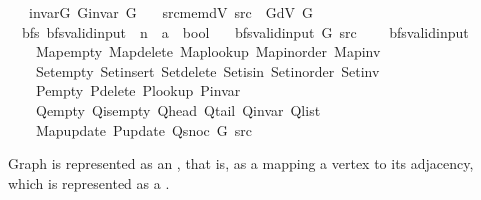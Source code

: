 \begin{isabellebody}
\ \ \ invar{\isacharunderscore}{\kern0pt}G{\isacharcolon}{\kern0pt}\ {\isachardoublequoteopen}G{\isachardot}{\kern0pt}invar\ G{\isachardoublequoteclose}\isanewline
\ \ \ src{\isacharunderscore}{\kern0pt}mem{\isacharunderscore}{\kern0pt}dV{\isacharcolon}{\kern0pt}\ {\isachardoublequoteopen}src\ {\isasymin}\ G{\isachardot}{\kern0pt}dV\ G{\isachardoublequoteclose}\isanewline
%
\isadeliminvisible
\isanewline
%
\endisadeliminvisible
%
\isataginvisible
{}\isamarkupfalse%
\ {\isacharparenleft}{\kern0pt}\ bfs{\isacharparenright}{\kern0pt}\ bfs{\isacharunderscore}{\kern0pt}valid{\isacharunderscore}{\kern0pt}input{\isacharprime}{\kern0pt}\ {\isacharcolon}{\kern0pt}{\isacharcolon}{\kern0pt}\ {\isachardoublequoteopen}{\isacharprime}{\kern0pt}n\ {\isasymRightarrow}\ {\isacharprime}{\kern0pt}a\ {\isasymRightarrow}\ bool{\isachardoublequoteclose}\ \isanewline
\ \ {\isachardoublequoteopen}bfs{\isacharunderscore}{\kern0pt}valid{\isacharunderscore}{\kern0pt}input{\isacharprime}{\kern0pt}\ G\ src\ {\isasymequiv}\isanewline
\ \ \ bfs{\isacharunderscore}{\kern0pt}valid{\isacharunderscore}{\kern0pt}input\isanewline
\ \ \ \ Map{\isacharunderscore}{\kern0pt}empty\ Map{\isacharunderscore}{\kern0pt}delete\ Map{\isacharunderscore}{\kern0pt}lookup\ Map{\isacharunderscore}{\kern0pt}inorder\ Map{\isacharunderscore}{\kern0pt}inv\isanewline
\ \ \ \ Set{\isacharunderscore}{\kern0pt}empty\ Set{\isacharunderscore}{\kern0pt}insert\ Set{\isacharunderscore}{\kern0pt}delete\ Set{\isacharunderscore}{\kern0pt}isin\ Set{\isacharunderscore}{\kern0pt}inorder\ Set{\isacharunderscore}{\kern0pt}inv\isanewline
\ \ \ \ P{\isacharunderscore}{\kern0pt}empty\ P{\isacharunderscore}{\kern0pt}delete\ P{\isacharunderscore}{\kern0pt}lookup\ P{\isacharunderscore}{\kern0pt}invar\isanewline
\ \ \ \ Q{\isacharunderscore}{\kern0pt}empty\ Q{\isacharunderscore}{\kern0pt}is{\isacharunderscore}{\kern0pt}empty\ Q{\isacharunderscore}{\kern0pt}head\ Q{\isacharunderscore}{\kern0pt}tail\ Q{\isacharunderscore}{\kern0pt}invar\ Q{\isacharunderscore}{\kern0pt}list\isanewline
\ \ \ \ Map{\isacharunderscore}{\kern0pt}update\ P{\isacharunderscore}{\kern0pt}update\ Q{\isacharunderscore}{\kern0pt}snoc\ G\ src{\isachardoublequoteclose}%
\endisataginvisible
{\isafoldinvisible}%
%
\isadeliminvisible
%
\endisadeliminvisible
%
\begin{isamarkuptext}%
Graph  is represented as an , that is, as a 
mapping a vertex to its adjacency, which is represented as a .%

\end{isamarkuptext}
\end{isabellebody}
